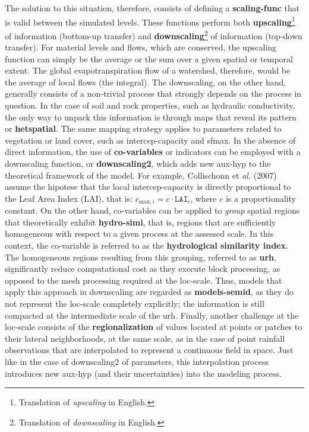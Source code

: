 \documentclass[./main_en.tex]{subfiles}
\begin{document}
\par The solution to this situation, therefore, consists of defining a \textbf{\gls{scaling-func}} that is valid between the simulated levels. These functions perform both \textbf{\gls{upscaling}}\footnote{Translation of \textit{upscaling} in English.} of information (bottom-up transfer) and \textbf{\gls{downscaling}}\footnote{Translation of \textit{downscaling} in English.} of information (top-down transfer). For material levels and flows, which are conserved, the \gls{upscaling} function can simply be the average or the sum over a given spatial or temporal extent. The global evapotranspiration flow of a watershed, therefore, would be the average of local flows (the integral). The \gls{downscaling}, on the other hand, generally consists of a non-trivial process that strongly depends on the process in question. In the case of soil and rock properties, such as hydraulic conductivity, the only way to unpack this information is through maps that reveal its pattern or \textbf{\gls{hetspatial}}. The same mapping strategy applies to \gls{parameters} related to vegetation or land cover, such as \gls{intercep-capacity} and \gls{sfmax}. In the absence of direct information, the use of \textbf{co-variables} or indicators can be employed with a \gls{downscaling} function, or \textbf{\gls{downscaling2}}, which adds new \gls{aux-hyp} to the theoretical framework of the \gls{model}. For example, Collischonn et \textit{al.} (2007) \cite{Collischonn2007} assume the \gls{hipotese} that the local \gls{intercep-capacity} is directly proportional to the Leaf Area Index (LAI), that is: $c_{\text{max}, i} = c \cdot \texttt{LAI}_{i}$, where $c$ is a proportionality constant. On the other hand, co-variables can be applied to \textit{group} spatial regions that theoretically exhibit \textbf{\gls{hydro-simi}}, that is, regions that are sufficiently homogeneous with respect to a given process at the assessed scale. In this context, the co-variable is referred to as the \textbf{hydrological similarity index}. The homogeneous regions resulting from this grouping, referred to as \textbf{\gls{urh}}, significantly reduce computational cost as they execute block processing, as opposed to the mesh processing required at the \gls{loc-scale}. Thus, models that apply this approach in \gls{downscaling} are regarded as \textbf{\gls{models-semid}}, as they do not represent the \gls{loc-scale} completely explicitly; the information is still compacted at the intermediate scale of the \gls{urh}. Finally, another challenge at the \gls{loc-scale} consists of the \textbf{\gls{regionalization}} of values located at points or patches to their lateral neighborhoods, at the same scale, as in the case of point rainfall observations that are interpolated to represent a continuous field in space. Just like in the case of \gls{downscaling2} of \gls{parameters}, this interpolation process introduces new \gls{aux-hyp} (and their uncertainties) into the modeling process.
\end{document}
